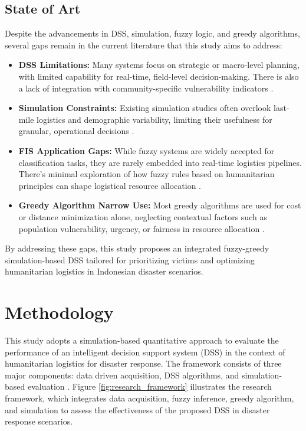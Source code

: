 \documentclass[journal,final,a4paper,twoside,11pt]{IEEEtran}
\begin{document}
\subsection{State of Art}
Despite the advancements in DSS, simulation, fuzzy logic, and greedy algorithms, several gaps remain in the current literature that this study aims to address:

\begin{itemize}
    \item \textbf{DSS Limitations:} Many systems focus on strategic or macro-level planning, with limited capability for real-time, field-level decision-making. There is also a lack of integration with community-specific vulnerability indicators \cite{steinhauser2025understanding}.
    \item \textbf{Simulation Constraints:} Existing simulation studies often overlook last-mile logistics and demographic variability, limiting their usefulness for granular, operational decisions \cite{ampaw2025developing}.
    \item \textbf{FIS Application Gaps:} While fuzzy systems are widely accepted for classification tasks, they are rarely embedded into real-time logistics pipelines. There's minimal exploration of how fuzzy rules based on humanitarian principles can shape logistical resource allocation \cite{anjomshoae2021integrated, improta2020fuzzy, jain2020membership, yoon2023novel}.
    \item \textbf{Greedy Algorithm Narrow Use:} Most greedy algorithms are used for cost or distance minimization alone, neglecting contextual factors such as population vulnerability, urgency, or fairness in resource allocation \cite{shirmarz2020adaptive, hamidouglu2023game}.
\end{itemize}

By addressing these gaps, this study proposes an integrated fuzzy-greedy simulation-based DSS tailored for prioritizing victims and optimizing humanitarian logistics in Indonesian disaster scenarios.


\section{Methodology} 

This study adopts a simulation-based quantitative approach to evaluate the performance of an intelligent decision support system (DSS) in the context of humanitarian logistics for disaster response. The framework consists of three major components: data driven acquisition, DSS algorithms, and simulation-based evaluation \cite{mahmoodi2024data}. Figure \ref{fig:research_framework} illustrates the research framework, which integrates data acquisition, fuzzy inference, greedy algorithm, and simulation to assess the effectiveness of the proposed DSS in disaster response scenarios.
\end{document}
